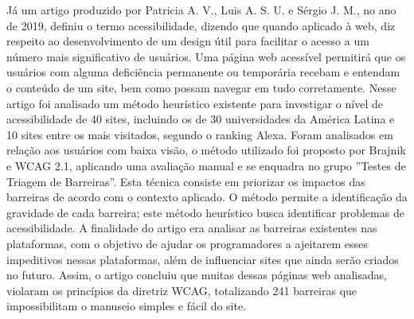 \documentclass[a4paper]{article}
\begin{document}
\begin{titlepage}
\begin{center}
\end{center}

Já um artigo produzido por Patricia A. V., Luis A. S. U. e Sérgio J. M., no ano de 2019, definiu o termo acessibilidade, dizendo que quando aplicado à web, diz respeito ao desenvolvimento de um design útil para facilitar o acesso a um número mais significativo de usuários. Uma página web acessível permitirá que os usuários com alguma deficiência permanente ou temporária recebam e entendam o conteúdo de um site, bem como possam navegar em tudo corretamente. Nesse artigo foi analisado um método heurístico existente para investigar o nível de acessibilidade de 40 sites, incluindo os de 30 universidades da América Latina e 10 sites entre os mais visitados, segundo o ranking Alexa. Foram analisados em relação aos usuários com baixa visão, o método utilizado foi proposto por Brajnik e WCAG 2.1, aplicando uma avaliação manual e se enquadra no grupo ''Testes de Triagem de Barreiras''. Esta técnica consiste em priorizar os impactos das barreiras de acordo com o contexto aplicado. O método permite a identificação da gravidade de cada barreira; este método heurístico busca identificar problemas de acessibilidade. A finalidade do artigo era analisar as barreiras existentes nas plataformas, com o objetivo de ajudar os programadores a ajeitarem esses impeditivos nessas plataformas, além de influenciar sites que ainda serão criados no futuro. Assim, o artigo concluiu que muitas dessas páginas web analisadas, violaram os princípios da diretriz WCAG, totalizando 241 barreiras que impossibilitam o manuseio simples e fácil do site.

\end{titlepage}
\end{document}
